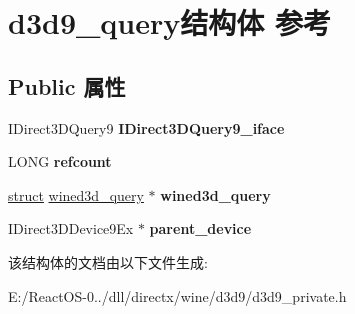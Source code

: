 \hypertarget{structd3d9__query}{}\section{d3d9\+\_\+query结构体 参考}
\label{structd3d9__query}
\subsection*{Public 属性}
\begin{DoxyCompactItemize}
\item 
\mbox{\label{structd3d9__query_a7fe9935b9ef1ae2d2193a15ab833ee78}} 
I\+Direct3\+D\+Query9 {\bfseries I\+Direct3\+D\+Query9\+\_\+iface}
\item 
\mbox{\label{structd3d9__query_a255a811a26a5cd4e6ce1c2e07879c0f4}} 
L\+O\+NG {\bfseries refcount}
\item 
\mbox{\label{structd3d9__query_ab103cb7d1624e8d707bbaee3ec5af71b}} 
\hyperlink{interfacestruct}{struct} \hyperlink{structwined3d__query}{wined3d\+\_\+query} $\ast$ {\bfseries wined3d\+\_\+query}
\item 
\mbox{\label{structd3d9__query_a36ff3070f32cd93ed044ba44c1a5d8b0}} 
I\+Direct3\+D\+Device9\+Ex $\ast$ {\bfseries parent\+\_\+device}
\end{DoxyCompactItemize}


该结构体的文档由以下文件生成\+:\begin{DoxyCompactItemize}
\item 
E\+:/\+React\+O\+S-\/0../dll/directx/wine/d3d9/d3d9\+\_\+private.\+h\end{DoxyCompactItemize}
